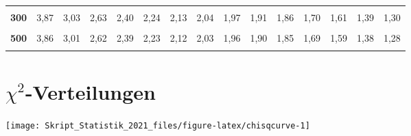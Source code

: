 \documentclass[
  11pt,
  ngerman,
  a4paper,
]{report}
\begin{document}
\begin{table}[H]
{\begin{tabular}{>{}r|rrrrrrrrrrrrrr}
\textbf{\cellcolor{gray!6}{200}} & \cellcolor{gray!6}{3,89} & \cellcolor{gray!6}{3,04} & \cellcolor{gray!6}{2,65} & \cellcolor{gray!6}{2,42} & \cellcolor{gray!6}{2,26} & \cellcolor{gray!6}{2,14} & \cellcolor{gray!6}{2,06} & \cellcolor{gray!6}{1,98} & \cellcolor{gray!6}{1,93} & \cellcolor{gray!6}{1,88} & \cellcolor{gray!6}{1,72} & \cellcolor{gray!6}{1,62} & \cellcolor{gray!6}{1,41} & \cellcolor{gray!6}{1,32}\\
\textbf{300} & 3,87 & 3,03 & 2,63 & 2,40 & 2,24 & 2,13 & 2,04 & 1,97 & 1,91 & 1,86 & 1,70 & 1,61 & 1,39 & 1,30\\
\textbf{\cellcolor{gray!6}{400}} & \cellcolor{gray!6}{3,86} & \cellcolor{gray!6}{3,02} & \cellcolor{gray!6}{2,63} & \cellcolor{gray!6}{2,39} & \cellcolor{gray!6}{2,24} & \cellcolor{gray!6}{2,12} & \cellcolor{gray!6}{2,03} & \cellcolor{gray!6}{1,96} & \cellcolor{gray!6}{1,90} & \cellcolor{gray!6}{1,85} & \cellcolor{gray!6}{1,69} & \cellcolor{gray!6}{1,60} & \cellcolor{gray!6}{1,38} & \cellcolor{gray!6}{1,28}\\
\textbf{500} & 3,86 & 3,01 & 2,62 & 2,39 & 2,23 & 2,12 & 2,03 & 1,96 & 1,90 & 1,85 & 1,69 & 1,59 & 1,38 & 1,28\\
\addlinespace
\textbf{\cellcolor{gray!6}{1000}} & \cellcolor{gray!6}{3,85} & \cellcolor{gray!6}{3,00} & \cellcolor{gray!6}{2,61} & \cellcolor{gray!6}{2,38} & \cellcolor{gray!6}{2,22} & \cellcolor{gray!6}{2,11} & \cellcolor{gray!6}{2,02} & \cellcolor{gray!6}{1,95} & \cellcolor{gray!6}{1,89} & \cellcolor{gray!6}{1,84} & \cellcolor{gray!6}{1,68} & \cellcolor{gray!6}{1,58} & \cellcolor{gray!6}{1,36} & \cellcolor{gray!6}{1,26}\\
\bottomrule
\end{tabular}}
\end{table}

\pagebreak

\hypertarget{tabelle-chisq}{%
\section*{\texorpdfstring{\(\chi^2\)-Verteilungen}{\textbackslash chi\^{}2-Verteilungen}}\label{tabelle-chisq}}

\begin{center}\texttt{[image: Skript\_Statistik\_2021\_files/figure-latex/chisqcurve-1]} \end{center}
\end{document}
